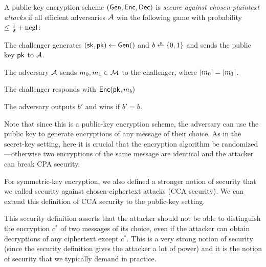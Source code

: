 \begin{definition}
  A public-key encryption scheme $(\mathsf{Gen}, \mathsf{Enc}, \mathsf{Dec})$ is \emph{secure against chosen-plaintext attacks}
  if all efficient adversaries $\mathcal{A}$ 
  win the following game with probability $\leq \tfrac{1}{2} + \operatorname{negl}$:

	\begin{compactitem}
  \item The challenger generates $({\mathsf{sk}}, \mathsf{pk}) \gets \mathsf{Gen}()$ and $b \getsr \bin$ and sends 
        the public key $\mathsf{pk}$ to $\mathcal{A}$.
  \item The adversary $\mathcal{A}$ sends $m_0, m_1 \in \mathcal{M}$ to the challenger,
        where $\left| m_0 \right| = \left| m_1 \right|$.
  \item The challenger responds with $\mathsf{Enc}(\mathsf{pk}, m_b)$		
  \item The adversary outputs $b'$ and wins if $b' = b$.
	\end{compactitem}
\end{definition}
Note that since this is a public-key encryption
scheme, the adversary can use the public key to
generate encryptions of any message of their choice. 
As in the secret-key setting, here it is crucial that
the encryption algorithm be randomized---otherwise
two encryptions of the same message are identical
and the attacker can break CPA security.

For symmetric-key encryption, we also defined
a stronger notion of security that we called
security against chosen-ciphertext attacks (CCA security).
We can extend this definition of CCA security
to the public-key setting.

This security definition asserts that the attacker should not be
able to distinguish the encryption $c^*$ of two messages of its choice,
even if the attacker can obtain decryptions of any ciphertext except
$c^*$.
This is a very strong notion of security (since the security definition
gives the attacker a lot of power) and it is the notion of security
that we typically demand in practice.

